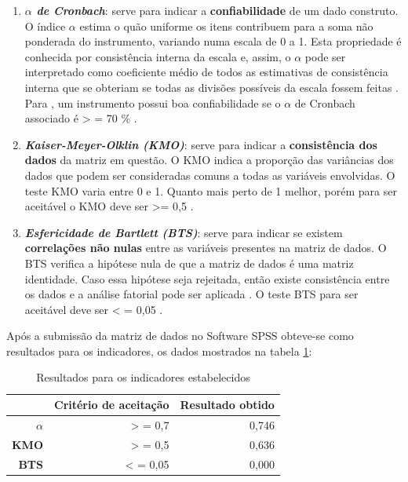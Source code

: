 \begin{enumerate}

\item \textbf{ \textit{ $\alpha$ de Cronbach}}: serve para indicar a \textbf{confiabilidade} de um dado construto. O índice $\alpha$ estima  o quão uniforme os itens contribuem para a soma não ponderada do instrumento, variando numa escala de 0 a 1. Esta propriedade é conhecida por consistência interna da escala e, assim, o $\alpha$ pode ser interpretado como coeficiente médio de todos as estimativas de consistência interna que se obteriam se todas as divisões possíveis da escala fossem feitas . Para  , um instrumento possui boa confiabilidade se o $\alpha$ de Cronbach associado é > = 70 \% . 

\item \textbf{\textit{Kaiser-Meyer-Olklin (KMO)}}: serve para indicar a \textbf{consistência dos dados} da matriz em questão. O KMO indica a proporção das variâncias dos dados que podem ser consideradas comuns a todas as variáveis envolvidas. O teste KMO varia entre 0 e 1. Quanto mais perto de 1 melhor, porém para ser aceitável o KMO deve ser >= 0,5 . 

\item \textit{\textbf{Esfericidade de Bartlett (BTS)}}: serve para indicar se existem \textbf{correlações não nulas} entre as variáveis presentes na matriz de dados. O BTS verifica a hipótese nula de que a matriz de dados é uma matriz identidade. Caso essa hipótese seja rejeitada, então existe consistência entre os dados e a análise fatorial pode ser aplicada . O teste BTS para ser aceitável deve ser < = 0,05 .  

\end{enumerate}

Após a submissão da matriz de dados no Software SPSS obteve-se como resultados para os indicadores, os dados mostrados na tabela \ref{Resultados_indicadores}:

\begin{table}[htbp]
  \centering
  \caption{Resultados para os indicadores estabelecidos}
    \begin{tabular}{|r|r|r|}
   \hline
          & \textbf{Critério de aceitação} & \textbf{Resultado obtido} \\\hline
   \textbf{ $\alpha$} & > = 0,7 & 0,746 \\\hline
   \textbf{ KMO}   & > = 0,5 & 0,636 \\\hline
   \textbf{ BTS}   & < = 0,05 & 0,000 \\\hline
    \end{tabular}%
  \label{Resultados_indicadores}%
\end{table}%

